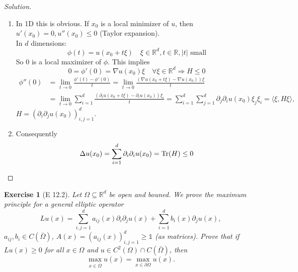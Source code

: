 \documentclass{report}
\theoremstyle{tommy}
\newtheorem{ex}[defn]{Exercise}
\begin{document}
  \begin{proof}[Solution]
    \begin{enumerate}[label=(\alph*)]
      \item In 1D this is obvious. If \(x_0\) is a local minimizer of \(u\), then \(u'(x_0) = 0, u''(x_0) \le 0\) (Taylor expansion). \\
      In \(d\) dimensions:
      \[\phi(t) = u(x_0 + t \xi) \quad \xi \in \mathbb{R}^d, t \in \mathbb{R}, |t| \text{ small}\]
      So \(0\) is a local maximizer of \(\phi\). This implies
      \[0 = \phi'(0) = \nabla u (x_0) \xi \quad \forall \xi \in \mathbb{R}^d \Rightarrow H \le 0\]
      \begin{align*}
        \phi''(0) &= \lim_{t \to 0} \frac{\phi'(t) - \phi'(0)}{t}
        = \lim_{t \to 0}\frac{(\nabla u(x_0 + t \xi) - \nabla u(x_0))\xi}{t} \\
        &= \lim_{t \to 0} \sum_{i=1}^d \frac{(\partial_i u(x_0 + t\xi)-\partial_i u(x_0))\xi_i}{t} = \sum_{i=1}^d \sum_{j=1}^d \partial_j \partial_i u(x_0) \xi_j \xi_i = \langle \xi, H\xi\rangle,
      \end{align*}
      \(H = (\partial_i \partial_j u(x_0))_{i,j = 1}^d\). 
      \item Consequently
      \[\Delta u(x_0) = \sum_{i=1}^d \partial_i \partial_i u(x_0) = \operatorname{Tr}(H) \le 0 \qedhere\]
    \end{enumerate}
  \end{proof}

  \begin{ex}[E 12.2]
    Let \(\Omega \subseteq \mathbb{R}^d\) be open and bouned. We prove the maximum principle for a general elliptic operator
    \[Lu(x) = \sum_{i,j=1}^d a_{ij}(x) \partial_i \partial_j u(x) + \sum_{i=1}^d b_i(x) \partial_ju(x),\]
      \(a_{ij}, b_i \in C(\bar \Omega)\), \(A(x) = (a_{ij}(x))_{i,j = 1}^d \ge \mathbb{1}\) (as matrices). %
      Prove that if \(Lu(x) \ge 0\) for all \(x \in \Omega\) and \(u \in C^2(\Omega) \cap C(\bar \Omega)\), then 
      \[\max_{x \in \bar \Omega}u(x) = \max_{x \in \partial \Omega} u(x).\]
  \end{ex}
\end{document}
